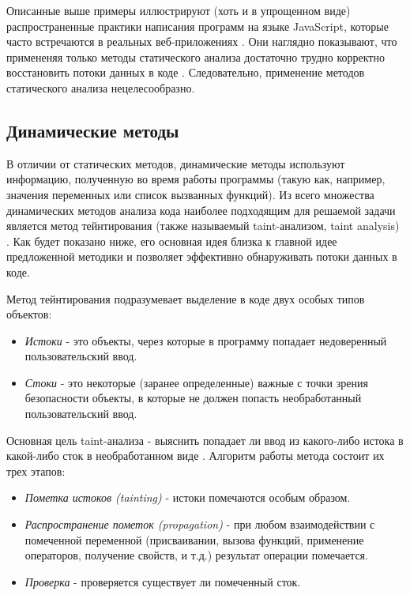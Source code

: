 	Описанные выше примеры иллюстрируют (хоть и в упрощенном виде) распространенные практики написания программ на языке JavaScript, которые часто встречаются в реальных веб-приложениях \cite{Richards2010}. Они наглядно показывают, что примененяя только методы статического анализа достаточно трудно корректно восстановить потоки данных в коде \cite{jensen}. Следовательно, применение методов статического анализа нецелесообразно.

\subsection{Динамические методы}
	В отличии от статических методов, динамические методы используют информацию, полученную во время работы программы (такую как, например, значения переменных или список вызванных функций). Из всего множества динамических методов анализа кода наиболее подходящим для решаемой задачи является метод тейнтирования (также называемый taint-анализом, taint analysis) \cite{taint} \cite{miller}. Как будет показано ниже, его основная идея близка к главной идее предложенной методики и позволяет эффективно обнаруживать потоки данных в коде.


	Метод тейнтирования подразумевает выделение в коде двух особых типов объектов:
	\begin{itemize}
		\item \textit{Истоки} - это объекты, через которые в программу попадает недоверенный пользовательский ввод.
		\item \textit{Стоки} - это некоторые (заранее определенные) важные с точки зрения безопасности объекты, в которые не должен попасть необработанный пользовательский ввод.
	\end{itemize}

	Основная цель taint-анализа - выяснить попадает ли ввод из какого-либо истока в какой-либо сток в необработанном виде \cite{miller}. Алгоритм работы метода состоит их трех этапов:

	\begin{itemize}
		\item \textit{Пометка истоков (tainting)} - истоки помечаются особым образом.
		\item \textit{Распространение пометок (propagation)} - при любом взаимодействии с помеченной переменной (присваивании, вызова функций, применение операторов, получение свойств, и т.д.) результат операции помечается.
		\item \textit{Проверка} - проверяется существует ли помеченный сток.
	\end{itemize}



